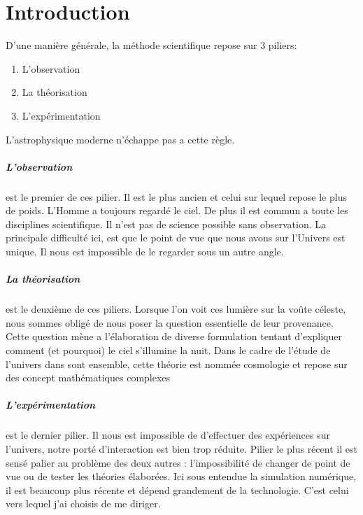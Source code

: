 \chapter{Introduction}


D'une manière générale, la méthode scientifique repose sur 3 piliers: 
\begin{enumerate}
\item L'observation
\item La théorisation
\item L'expérimentation
\end{enumerate}
L'astrophysique moderne n’échappe pas a cette règle.


\paragraph{L'observation} est le premier de ces pilier. 
Il est le plus ancien et celui sur lequel repose le plus de poids.
L'Homme a toujours regardé le ciel.
De plus il est commun a toute les disciplines scientifique.
Il n'est pas de science possible sans observation.
La principale difficulté ici, est que le point de vue que nous avons sur l'Univers est unique. 
Il nous est impossible de le regarder sous un autre angle.

\paragraph{La théorisation} est le deuxième de ces piliers.
Lorsque l'on voit ces lumière sur la voûte céleste, nous sommes obligé de nous poser la question essentielle de leur provenance.
Cette question mène a l'élaboration de diverse formulation tentant d'expliquer comment (et pourquoi) le ciel s'illumine la nuit.  
Dans le cadre de l'étude de l'univers dans sont ensemble, cette théorie est nommée cosmologie et repose sur des concept mathématiques complexes


\paragraph{L'expérimentation} est le dernier pilier.
Il nous est impossible de d'effectuer des expériences sur l'univers, notre porté d'interaction est bien trop réduite.
Pilier le plus récent il est sensé palier au problème des deux autres : l'impossibilité de changer de point de vue ou de tester les théories élaborées.
Ici sous entendue la simulation numérique, il est beaucoup plus récente et dépend grandement de la technologie.
C'est celui vers lequel j'ai choisis de me diriger.






